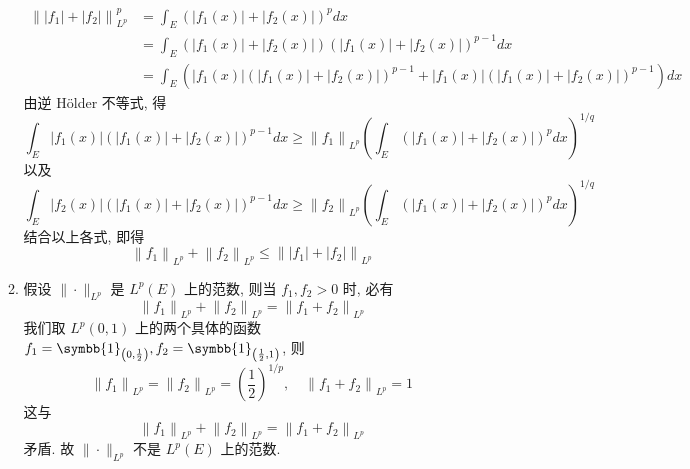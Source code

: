 \begin{enumerate}
\begin{answer}
\begin{enumerate}
                \[
                \begin{aligned}
                \left\|\left|f_{1}\right|+\left|f_{2}\right|\right\|_{L^{p}}^{p} &=\int_{E}\left(\left|f_{1}(x)\right|+\left|f_{2}(x)\right|\right)^{p} d x \\
                &=\int_{E}\left(\left|f_{1}(x)\right|+\left|f_{2}(x)\right|\right)\left(\left|f_{1}(x)\right|+\left|f_{2}(x)\right|\right)^{p-1} d x \\
                &=\int_{E}\left(\left|f_{1}(x)\right|\left(\left|f_{1}(x)\right|+\left|f_{2}(x)\right|\right)^{p-1}+\left|f_{1}(x)\right|\left(\left|f_{1}(x)\right|+\left|f_{2}(x)\right|\right)^{p-1}\right) d x
                \end{aligned}
                \]
                由逆 Hölder 不等式, 得
                \[
                \int_{E}\left|f_{1}(x)\right|\left(\left|f_{1}(x)\right|+\left|f_{2}(x)\right|\right)^{p-1} d x \geq\left\|f_{1}\right\|_{L^{p}}\left(\int_{E}\left(\left|f_{1}(x)\right|+\left|f_{2}(x)\right|\right)^{p} d x\right)^{1 / q}
                \]
                以及
                \[
                \int_{E}\left|f_{2}(x)\right|\left(\left|f_{1}(x)\right|+\left|f_{2}(x)\right|\right)^{p-1} d x \geq\left\|f_{2}\right\|_{L^{p}}\left(\int_{E}\left(\left|f_{1}(x)\right|+\left|f_{2}(x)\right|\right)^{p} d x\right)^{1 / q}
                \]
                结合以上各式, 即得
                \[
                \left\|f_{1}\right\|_{L^{p}}+\left\|f_{2}\right\|_{L^{p}} \leq\left\|\left|f_{1}\right|+\left|f_{2}\right|\right\|_{L^{p}}
                \]
                \item 假设 $\|\cdot\|_{L^{p}}$ 是 $L^{p}(E)$ 上的范数, 则当 $f_{1}, f_{2}>0$ 时, 必有
                \[
                \left\|f_{1}\right\|_{L^{p}}+\left\|f_{2}\right\|_{L^{p}}=\left\|f_{1}+f_{2}\right\|_{L^{p}}
                \]
                我们取 $L^{p}(0,1)$ 上的两个具体的函数 $f_{1}=\symbb{1}_{\left(0, \frac{1}{2}\right)}, f_{2}=\symbb{1}_{\left(\frac{1}{2}, 1\right)}$, 则
                \[
                \left\|f_{1}\right\|_{L^{p}}=\left\|f_{2}\right\|_{L^{p}}=\left(\frac{1}{2}\right)^{1 / p}, \quad\left\|f_{1}+f_{2}\right\|_{L^{p}}=1
                \]
                这与
                \[
                \left\|f_{1}\right\|_{L^{p}}+\left\|f_{2}\right\|_{L^{p}}=\left\|f_{1}+f_{2}\right\|_{L^{p}}
                \]
                矛盾. 故 $\|\cdot\|_{L^{p}}$ 不是 $L^{p}(E)$ 上的范数.\qedhere
            \end{enumerate}
        \end{answer}

\end{enumerate}
